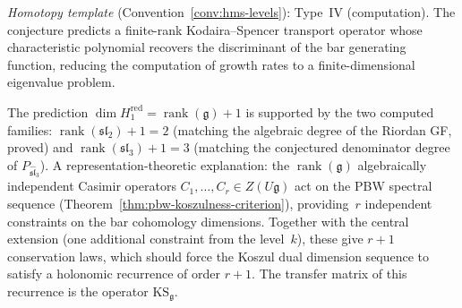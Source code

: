 \begin{remark}[Scope]
\emph{Homotopy template} (Convention~\ref{conv:hms-levels}): Type~IV (computation).
The conjecture predicts a finite-rank Kodaira--Spencer transport operator whose characteristic polynomial recovers the discriminant of the bar generating function, reducing the computation of growth rates to a finite-dimensional eigenvalue problem.
\end{remark}

\begin{remark}\label{rem:rank-plus-one}
The prediction $\dim H^{\mathrm{red}}_1 =
\operatorname{rank}(\mathfrak{g}) + 1$ is supported by
the two computed families:
$\operatorname{rank}(\mathfrak{sl}_2) + 1 = 2$
(matching the algebraic degree of the Riordan GF, proved) and
$\operatorname{rank}(\mathfrak{sl}_3) + 1 = 3$
(matching the conjectured denominator degree of
$P_{\widehat{\mathfrak{sl}}_3}$).
A representation-theoretic explanation: the
$\operatorname{rank}(\mathfrak{g})$ algebraically independent
Casimir operators $C_1, \ldots, C_r \in Z(U\mathfrak{g})$ act
on the PBW spectral sequence
(Theorem~\ref{thm:pbw-koszulness-criterion}), providing~$r$
independent constraints on the bar cohomology dimensions.  Together
with the central extension (one additional constraint from the
level~$k$), these give $r + 1$ conservation laws, which should
force the Koszul dual dimension sequence to satisfy a holonomic
recurrence of order $r + 1$.  The transfer matrix of this
recurrence is the operator $\mathrm{KS}_{\mathfrak{g}}$.
\end{remark}

